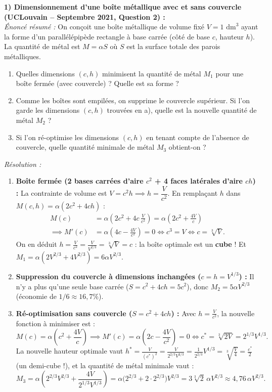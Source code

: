 \begin{exemple}
\textbf{1) Dimensionnement d'une boîte métallique avec et sans couvercle (UCLouvain -- Septembre 2021, Question 2) :}\\
\emph{Énoncé résumé :} On conçoit une boîte métallique de volume fixé $V = 1\text{ dm}^3$ ayant la forme d'un parallélépipède rectangle à base carrée (côté de base $c$, hauteur $h$). La quantité de métal est $M = \alpha S$ où $S$ est la surface totale des parois métalliques.
\begin{enumerate}[label=\alph*)]
    \item Quelles dimensions $(c, h)$ minimisent la quantité de métal $M_1$ pour une boîte fermée (avec couvercle) ? Quelle est sa forme ?
    \item Comme les boîtes sont empilées, on supprime le couvercle supérieur. Si l'on garde les dimensions $(c, h)$ trouvées en a), quelle est la nouvelle quantité de métal $M_2$ ?
    \item Si l'on ré-optimise les dimensions $(c, h)$ en tenant compte de l'absence de couvercle, quelle quantité minimale de métal $M_3$ obtient-on ?
\end{enumerate}
\emph{Résolution :}
\begin{enumerate}[label=\alph*)]
    \item \textbf{Boîte fermée (2 bases carrées d'aire $c^2$ + 4 faces latérales d'aire $ch$) :}
    La contrainte de volume est $V = c^2 h \implies h = \dfrac{V}{c^2}$. En remplaçant $h$ dans $M(c, h) = \alpha(2c^2 + 4ch)$ :
    \begin{align*}
        M(c) &= \alpha\left(2c^2 + 4c\,\frac{V}{c^2}\right) = \alpha\left(2c^2 + \frac{4V}{c}\right) \\
        \implies M'(c) &= \alpha\left(4c - \frac{4V}{c^2}\right) = 0 \iff c^3 = V \iff \boxed{c = \sqrt[3]{V}}.
    \end{align*}
    On en déduit $h = \frac{V}{c^2} = \frac{V}{V^{2/3}} = \sqrt[3]{V} = c$ : la boîte optimale est un \textbf{cube} ! Et $M_1 = \alpha(2V^{2/3} + 4V^{2/3}) = \boxed{6\alpha V^{2/3}}$.
    \item \textbf{Suppression du couvercle à dimensions inchangées ($c = h = V^{1/3}$) :} Il n'y a plus qu'une seule base carrée ($S = c^2 + 4ch = 5c^2$), donc $\boxed{M_2 = 5\alpha V^{2/3}}$ (économie de $1/6 \approx 16,7\%$).
    \item \textbf{Ré-optimisation sans couvercle ($S = c^2 + 4ch$) :} Avec $h = \frac{V}{c^2}$, la nouvelle fonction à minimiser est :
    \[
        M(c) = \alpha\left(c^2 + \frac{4V}{c}\right) \implies M'(c) = \alpha\left(2c - \frac{4V}{c^2}\right) = 0 \iff \boxed{c^* = \sqrt[3]{2V} = 2^{1/3}V^{1/3}}.
    \]
    La nouvelle hauteur optimale vaut $h^* = \frac{V}{(c^*)^2} = \frac{V}{2^{2/3}V^{2/3}} = \frac{1}{2^{2/3}}V^{1/3} = \sqrt[3]{\frac{V}{4}} = \frac{c^*}{2}$ (un demi-cube !), et la quantité de métal minimale vaut :
    \[
        M_3 = \alpha\left(2^{2/3}V^{2/3} + \frac{4V}{2^{1/3}V^{1/3}}\right) = \alpha\bigl(2^{2/3} + 2\cdot 2^{2/3}\bigr)V^{2/3} = \boxed{3\sqrt[3]{2}\,\alpha V^{2/3} \approx 4,76\,\alpha V^{2/3}}.
    \]
\end{enumerate}


\end{exemple}
